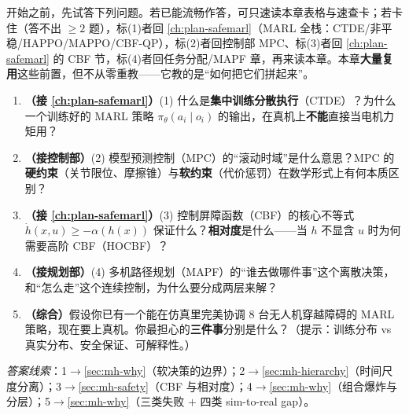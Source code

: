 \begin{practice}[前置自测]
开始之前，先试答下列问题。若已能流畅作答，可只速读本章表格与速查卡；若卡住（答不出 $\ge 2$ 题），标(1)者回 \cref{ch:plan-safemarl}（MARL 全栈：CTDE/非平稳/HAPPO/MAPPO/CBF-QP），标(2)者回控制部 MPC、标(3)者回 \cref{ch:plan-safemarl} 的 CBF 节，标(4)者回任务分配/MAPF 章，再来读本章。本章\textbf{大量复用}这些前置，但不从零重教——它教的是“如何把它们拼起来”。
\begin{enumerate}
  \item \textbf{（接 \cref{ch:plan-safemarl}）}(1) 什么是\textbf{集中训练分散执行}（CTDE）？为什么一个训练好的 MARL 策略 $\pi_\theta(a_i\mid o_i)$ 的输出，在真机上\textbf{不能}直接当电机力矩用？
  \item \textbf{（接控制部）}(2) 模型预测控制（MPC）的“滚动时域”是什么意思？MPC 的\textbf{硬约束}（关节限位、摩擦锥）与\textbf{软约束}（代价惩罚）在数学形式上有何本质区别？
  \item \textbf{（接 \cref{ch:plan-safemarl}）}(3) 控制屏障函数（CBF）的核心不等式 $\dot h(x,u)\ge-\alpha(h(x))$ 保证什么？\textbf{相对度}是什么——当 $h$ 不显含 $u$ 时为何需要高阶 CBF（HOCBF）？
  \item \textbf{（接规划部）}(4) 多机路径规划（MAPF）的“谁去做哪件事”这个离散决策，和“怎么走”这个连续控制，为什么要分成两层来解？
  \item \textbf{（综合）}假设你已有一个能在仿真里完美协调 $8$ 台无人机穿越障碍的 MARL 策略，现在要上真机。你最担心的\textbf{三件事}分别是什么？（提示：训练分布 vs 真实分布、安全保证、可解释性。）
\end{enumerate}
\noindent\emph{答案线索}：1$\to$\cref{sec:mh-why}（软决策的边界）；2$\to$\cref{sec:mh-hierarchy}（时间尺度分离）；3$\to$\cref{sec:mh-safety}（CBF 与相对度）；4$\to$\cref{sec:mh-why}（组合爆炸与分层）；5$\to$\cref{sec:mh-why}（三类失败 $+$ 四类 sim-to-real gap）。
\end{practice}

